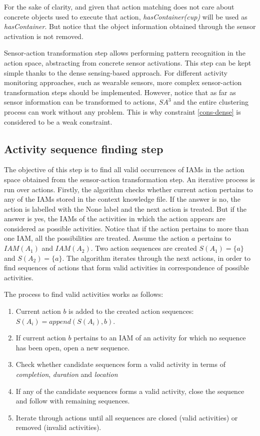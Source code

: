 For the sake of clarity, and given that action matching does not care about concrete objects used to execute that action, \textit{hasContainer(cup)} will be used as \textit{hasContainer}. But notice that the object information obtained through the sensor activation is not removed. 

Sensor-action transformation step allows performing pattern recognition in the action space, abstracting from concrete sensor activations. This step can be kept simple thanks to the dense sensing-based approach. For different activity monitoring approaches, such as wearable sensors, more complex sensor-action transformation steps should be implemented. However, notice that as far as sensor information can be transformed to actions, $SA^3$ and the entire clustering process can work without any problem. This is why constraint \ref{cons-dense} is considered to be a weak constraint.

\subsection{Activity sequence finding step}
\label{subsec:clustering:sa3:find}

The objective of this step is to find all valid occurrences of IAMs in the action space obtained from the sensor-action transformation step. An iterative process is run over actions. Firstly, the algorithm checks whether current action pertains to any of the IAMs stored in the context knowledge file. If the answer is no, the action is labelled with the None label and the next action is treated. But if the answer is yes, the IAMs of the activities in which the action appears are considered as possible activities. Notice that if the action pertains to more than one IAM, all the possibilities are treated. Assume the action $a$ pertains to $IAM(A_1)$ and $IAM(A_2)$. Two action sequences are created $S(A_1) = \{a\}$ and $S(A_2) = \{a\}$. The algorithm iterates through the next actions, in order to find sequences of actions that form valid activities in correspondence of possible activities.

The process to find valid activities works as follows:

\begin{enumerate}
 \item Current action $b$ is added to the created action sequences: $S(A_i) = append(S(A_i), b)$.
 \item If current action $b$ pertains to an IAM of an activity for which no sequence has been open, open a new sequence.
 \item Check whether candidate sequences form a valid activity in terms of \textit{completion}, \textit{duration} and \textit{location}
 \item If any of the candidate sequences forms a valid activity, close the sequence and follow with remaining sequences.
 \item Iterate through actions until all sequences are closed (valid activities) or removed (invalid activities).
\end{enumerate}


